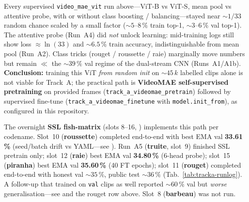 Every supervised \texttt{video\_mae\_vit} run above---ViT-B vs ViT-S, mean pool
vs attentive probe, with or without class boosting / balancing---stayed near
\(\sim 1/33\) random chance scaled by a small factor (\(\sim 5\)--\(8\,\%\)
train top-1, \(\sim 3\)--\(6\,\%\) val top-1).  The attentive probe (Run~A4)
did \emph{not} unlock learning: mid-training logs still show loss \(\approx
\ln(33)\) and \(\sim 6.5\,\%\) train accuracy, indistinguishable from mean pool
(Run~A2).  Class tricks (rouget / roussette / raie) marginally move numbers
but remain \(\ll\) the \(\sim 39\,\%\) val regime of the dual-stream CNN
(Runs~A1/A1b).  \textbf{Conclusion:} training this ViT \emph{from random init}
on \(\sim 45\,k\) labelled clips alone is not viable for Track~A; the
practical path is \textbf{VideoMAE self-supervised pretraining} on
provided frames (\texttt{track\_a\_videomae\_pretrain}) followed by supervised
fine-tune (\texttt{track\_a\_videomae\_finetune} with
\texttt{model.init\_from}), as configured in this repository.

The overnight \textbf{SSL fish-matrix} (slots 8--16, ) implements
this path per codename.  Slot~10 (\textbf{roussette}) completed end-to-end with
best EMA val \textbf{33.61\,\%} (seed/batch drift vs YAML---see
).  Run~A5 (\textbf{truite}, slot~9) finished SSL pretrain only;
slot~12 (\textbf{raie}) best EMA val \textbf{34.80\,\%} (6-head probe);
slot~15 (\textbf{piranha}) best EMA val \textbf{35.60\,\%} (40 FT epochs);
slot~11 (\textbf{rouget}) completed end-to-end with honest val \(\sim 35\,\%\),
public test \(\sim 36\,\%\) (Tab.~\ref{tab:tracka-runlog}).
A follow-up that trained on \texttt{val} clips as well reported \(\sim 60\,\%\)
val but \emph{worse} generalisation---see  and the rouget
row above.  Slot~8 (\textbf{barbeau}) was not run.
